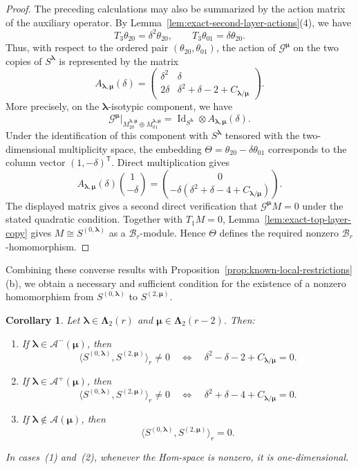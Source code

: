 \documentclass[10pt,a4paper]{amsart}
\newtheorem{corollary}[theorem]{Corollary}
\newcommand{\1}{\mathfrak{1}}
\newcommand{\B}{\mathcal{B}}
\begin{document}
\begin{proof}
The preceding calculations may also be summarized by the
action matrix of the auxiliary operator.
By Lemma~\ref{lem:exact-second-layer-actions}(4), we have
$$
T_3\theta_{20}=\delta^2\theta_{20},
\qquad
T_3\theta_{01}=\delta\theta_{20}.
$$
Thus, with respect to the ordered pair
$(\theta_{20},\theta_{01})$, the action of
$\mathcal G^{\bm\mu}$ on the two copies of
$S^{\bm\lambda}$ is represented by the matrix
\begin{equation}\label{eq:exact-action-matrix}
A_{\bm\lambda,\bm\mu}(\delta)=
\begin{pmatrix}
\delta^2&\delta\\
2\delta&\delta^2+\delta-2+C_{\bm\lambda/\bm\mu}
\end{pmatrix}.
\end{equation}
More precisely, on the $\bm\lambda$-isotypic component,
we have
$$
\mathcal G^{\bm\mu}\big|_{
M_{20}^{\bm\lambda,\bm\mu}\oplus
M_{01}^{\bm\lambda,\bm\mu}}
=
\operatorname{Id}_{S^{\bm\lambda}}
\otimes A_{\bm\lambda,\bm\mu}(\delta).
$$
Under the identification of this component with \(S^{\bm\lambda}\) tensored with the two-dimensional multiplicity space, the embedding $\Theta=\theta_{20}-\delta\theta_{01}$
corresponds to the column vector
$(1,-\delta)^{\mathsf T}$. Direct multiplication gives
$$
A_{\bm\lambda,\bm\mu}(\delta)
\binom{1}{-\delta}
=
\binom{0}{
-\delta(\delta^2+\delta-4+C_{\bm\lambda/\bm\mu})}.
$$
The displayed matrix gives a second direct verification
that $\mathcal G^{\bm\mu}M=0$ under the stated quadratic
condition.
Together with $T_1M=0$,
Lemma~\ref{lem:exact-top-layer-copy} gives
$M\cong S^{(0,\bm\lambda)}$ as a $\B_r$-module.
Hence $\Theta$ defines the required nonzero
$\B_r$-homomorphism.
\end{proof}

Combining these converse results with Proposition~\ref{prop:known-local-restrictions}(b), we obtain a necessary and sufficient condition for the existence of a nonzero homomorphism from $S^{(0,\bm\lambda)}$ to $S^{(2,\bm\mu)}$.

\begin{corollary}\label{cor:exact-local-criterion}
Let $\bm\lambda\in\bm\Lambda_2(r)$ and
$\bm\mu\in\bm\Lambda_2(r-2)$.
Then:
\begin{enumerate}
\item If $\bm\lambda\in\mathcal A^-(\bm\mu)$, then
$$
\langle S^{(0,\bm\lambda)},S^{(2,\bm\mu)}\rangle_r\neq0
\quad\Longleftrightarrow\quad
\delta^2-\delta-2+C_{\bm\lambda/\bm\mu}=0.
$$
\item If $\bm\lambda\in\mathcal A^+(\bm\mu)$, then
$$
\langle S^{(0,\bm\lambda)},S^{(2,\bm\mu)}\rangle_r\neq0
\quad\Longleftrightarrow\quad
\delta^2+\delta-4+C_{\bm\lambda/\bm\mu}=0.
$$
\item If $\bm\lambda\notin\mathcal A(\bm\mu)$, then
$$
\langle S^{(0,\bm\lambda)},S^{(2,\bm\mu)}\rangle_r=0.
$$
\end{enumerate}
In cases~{\rm(1)} and~{\rm(2)}, whenever the Hom-space
is nonzero, it is one-dimensional.
\end{corollary}
\end{document}
